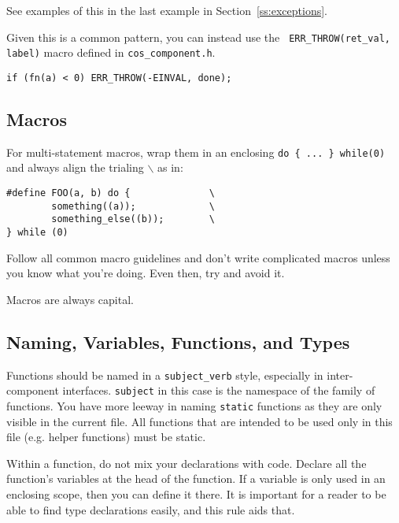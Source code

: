\documentclass[11pt,onecolumn]{article}
\newcommand{\head}[1]{\vspace{0.4em}\noindent{\bf #1}}
\begin{document}
See examples of this in the last example in
Section~\ref{ss:exceptions}.

Given this is a common pattern, you can instead use the {\tt
  ERR\_THROW(ret\_val, label)} macro defined in {\tt cos\_component.h}.

    \begin{minipage}{3in}
      \footnotesize
      \lstset{language=C}
      \begin{lstlisting}
if (fn(a) < 0) ERR_THROW(-EINVAL, done);
      \end{lstlisting}
    \end{minipage}

\subsection{Macros}

For multi-statement macros, wrap them in an enclosing {\tt do \{ ... \}
  while(0)} and always align the trialing {\tt $\backslash$} as in:

    \begin{minipage}{3in}
      \footnotesize
      \lstset{language=C}
      \begin{lstlisting}
#define FOO(a, b) do {              \
        something((a));             \
        something_else((b));        \
} while (0) 
      \end{lstlisting}
    \end{minipage}

Follow all common macro guidelines and don't write complicated macros
unless you know what you're doing.  Even then, try and avoid it.

Macros are always capital.

\subsection{Naming, Variables, Functions, and Types}

Functions should be named in a {\tt subject\_verb} style, especially
in inter-component interfaces.  {\tt subject} in this case is the
namespace of the family of functions.  You have more leeway in naming
{\tt static} functions as they are only visible in the current file.
All functions that are intended to be used only in this file
(e.g. helper functions) must be static.  

\head{Variables.} Within a function, do not mix your declarations with
code.  Declare all the function's variables at the head of the
function.  If a variable is only used in an enclosing scope, then you
can define it there.  It is important for a reader to be able to find
type declarations easily, and this rule aids that.
\end{document}
